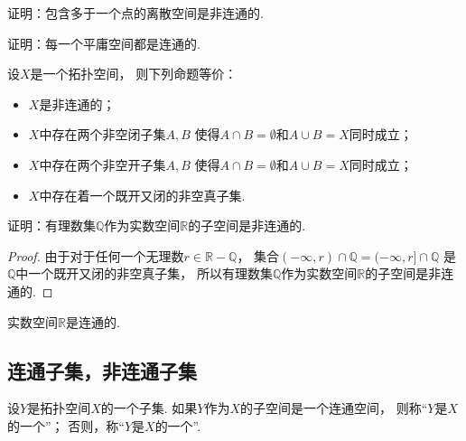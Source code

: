 \begin{example}
证明：包含多于一个点的离散空间是非连通的.
\end{example}

\begin{example}
证明：每一个平庸空间都是连通的.
\end{example}

\begin{theorem}
设\(X\)是一个拓扑空间，
则下列命题等价：\begin{itemize}
	\item \(X\)是非连通的；

	\item \(X\)中存在两个非空闭子集\(A,B\)
	使得\(A \cap B = \emptyset\)和\(A \cup B = X\)同时成立；

	\item \(X\)中存在两个非空开子集\(A,B\)
	使得\(A \cap B = \emptyset\)和\(A \cup B = X\)同时成立；

	\item \(X\)中存在着一个既开又闭的非空真子集.
\end{itemize}
\end{theorem}

\begin{example}
证明：有理数集\(\mathbb{Q}\)作为实数空间\(\mathbb{R}\)的子空间是非连通的.
\begin{proof}
由于对于任何一个无理数\(r \in \mathbb{R}-\mathbb{Q}\)，
集合\((-\infty,r)\cap\mathbb{Q}
= (-\infty,r]\cap\mathbb{Q}\)
是\(\mathbb{Q}\)中一个既开又闭的非空真子集，
所以有理数集\(\mathbb{Q}\)作为实数空间\(\mathbb{R}\)的子空间是非连通的.
\end{proof}
\end{example}

\begin{theorem}\label{theorem:连通空间.实数空间是连通空间}
实数空间\(\mathbb{R}\)是连通的.
\end{theorem}

\subsection{连通子集，非连通子集}
\begin{definition}
设\(Y\)是拓扑空间\(X\)的一个子集.
如果\(Y\)作为\(X\)的子空间是一个连通空间，
则称“\(Y\)是\(X\)的一个”；
否则，称“\(Y\)是\(X\)的一个”.
\end{definition}


